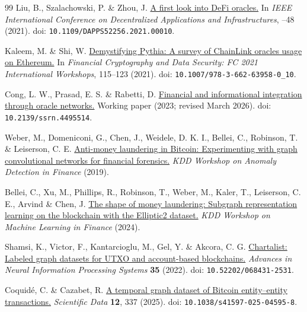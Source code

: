 \begin{thebibliography}{99}
Liu, B., Szalachowski, P. \& Zhou, J.
\href{https://doi.org/10.1109/DAPPS52256.2021.00010}{A first look into DeFi oracles.}
\linebreak
In \emph{IEEE International Conference on Decentralized Applications and Infrastructures}, --48 (2021).
doi: \nolinkurl{10.1109/DAPPS52256.2021.00010}.

Kaleem, M. \& Shi, W.
\href{https://doi.org/10.1007/978-3-662-63958-0_10}{Demystifying Pythia: A survey of ChainLink oracles usage on Ethereum.}
In \emph{Financial Cryptography and Data Security: FC 2021 International \linebreak Workshops}, 115--123 (2021).
doi: \nolinkurl{10.1007/978-3-662-63958-0_10}.

Cong, L. W., Prasad, E. S. \& Rabetti, D.
\href{https://doi.org/10.2139/ssrn.4495514}{Financial and informational integration through oracle networks.}
Working paper (2023; revised March 2026).
doi: \nolinkurl{10.2139/ssrn.4495514}.

Weber, M., Domeniconi, G., Chen, J., Weidele, D. K. I., Bellei, C., Robinson, T. \& Leiserson, C. E.
\href{https://arxiv.org/abs/1908.02591}{Anti-money laundering in Bitcoin: Experimenting with graph convolutional networks for financial forensics.}
\emph{KDD Workshop on Anomaly Detection in Finance} (2019).


Bellei, C., Xu, M., Phillips, R., Robinson, T., Weber, M., Kaler, T., Leiserson, C. E., Arvind \& Chen, J.
\href{https://arxiv.org/abs/2404.19109}{The shape of money laundering: Subgraph representation learning on the blockchain with the Elliptic2 dataset.}
\emph{KDD Workshop on Machine Learning in Finance} (2024).


Shamsi, K., Victor, F., Kantarcioglu, M., Gel, Y. \& Akcora, C. G.
\href{https://doi.org/10.52202/068431-2531}{Chartalist: Labeled graph datasets for UTXO and account-based blockchains.}
\emph{Advances in Neural Information \linebreak Processing Systems} \textbf{35} (2022).
doi: \nolinkurl{10.52202/068431-2531}.

Coquid\'e, C. \& Cazabet, R.
\href{https://doi.org/10.1038/s41597-025-04595-8}{A temporal graph dataset of Bitcoin entity--entity transactions.}
\emph{Scientific Data} \textbf{12}, 337 (2025).
doi: \nolinkurl{10.1038/s41597-025-04595-8}.


\end{thebibliography}
